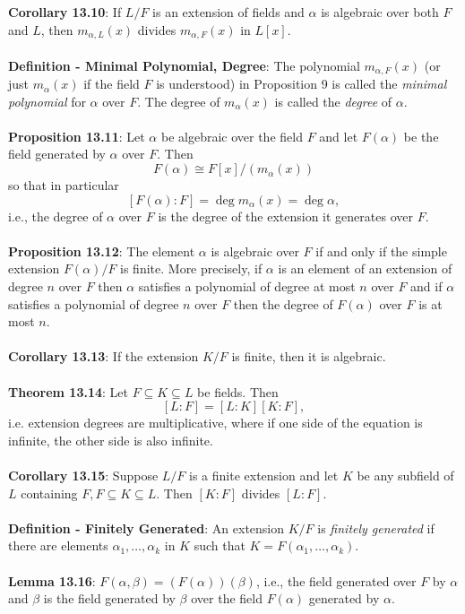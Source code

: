 \documentclass{article}
\begin{document}
\textbf{Corollary 13.10}: If $L/F$ is an extension of fields and $\alpha$ is algebraic over both $F$ and $L$, then $m_{\alpha, L}(x)$ divides $m_{\alpha, F}(x)$ in $L[x]$. \\ \\
\textbf{Definition - Minimal Polynomial, Degree}: The polynomial $m_{\alpha, F}(x)$ (or just $m_\alpha(x)$ if the field $F$ is understood) in Proposition 9 is called the \textit{minimal polynomial} for $\alpha$ over $F$. The degree of $m_\alpha(x)$ is called the \textit{degree} of $\alpha$. \\ \\
\textbf{Proposition 13.11}: Let $\alpha$ be algebraic over the field $F$ and let $F(\alpha)$ be the field generated
by $\alpha$ over $F$. Then $$F(\alpha) \cong F[x]/(m_\alpha(x))$$ so that in particular $$[F(\alpha) : F] = \deg{m_\alpha(x)} = \deg{\alpha},$$ i.e., the degree of $\alpha$ over $F$ is the degree of the extension it generates over $F$. \\ \\
\textbf{Proposition 13.12}: The element $\alpha$ is algebraic over $F$ if and only if the simple extension
$F(\alpha) / F$ is finite. More precisely, if $\alpha$ is an element of an extension of degree $n$ over $F$ then $\alpha$ satisfies a polynomial of degree at most $n$ over $F$ and if $\alpha$ satisfies a polynomial of degree $n$ over $F$ then the degree of $F(\alpha)$ over $F$ is at most $n$. \\ \\
\textbf{Corollary 13.13}: If the extension $K / F$ is finite, then it is algebraic. \\ \\
\textbf{Theorem 13.14}: Let $F \subseteq K \subseteq L$ be fields. Then $$[L : F] = [L : K][K : F],$$ i.e. extension degrees are multiplicative, where if one side of the equation is infinite, the other side is also infinite. \\ \\
\textbf{Corollary 13.15}: Suppose $L/ F$ is a finite extension and let $K$ be any subfield of $L$ containing $F, F \subseteq K \subseteq L$. Then $[K : F]$ divides $[L : F]$. \\ \\
\textbf{Definition - Finitely Generated}: An extension $K / F$ is \textit{finitely generated} if there are elements $\alpha_1, \dots, \alpha_k$ in $K$ such that $K = F(\alpha_1, \dots, \alpha_k)$. \\ \\
\textbf{Lemma 13.16}: $F(\alpha, \beta) = (F(\alpha))(\beta)$, i.e., the field generated over $F$ by $\alpha$ and $\beta$ is the field generated by $\beta$ over the field $F(\alpha)$ generated by $\alpha$. \\ \\
\end{document}
